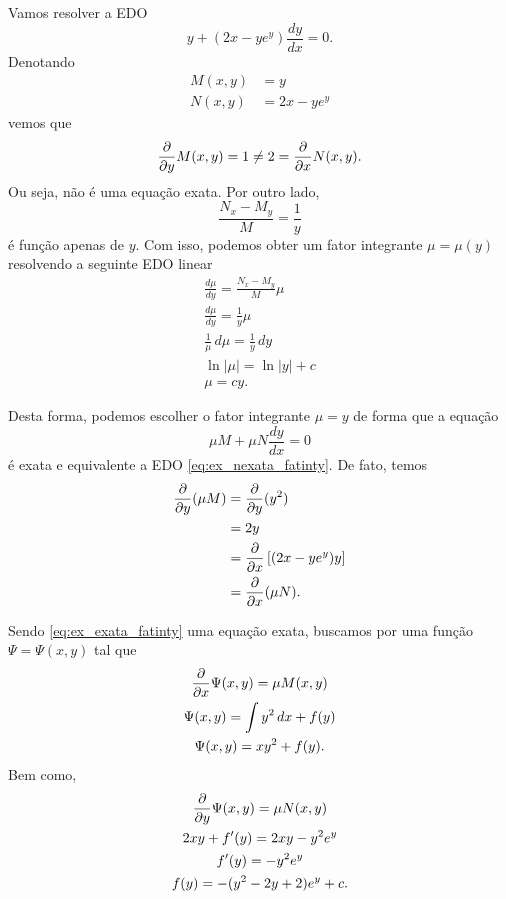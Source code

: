 \begin{ex}
  Vamos resolver a EDO
  \begin{equation}\label{eq:ex_nexata_fatinty}
    y + (2x - ye^y)\frac{dy}{dx} = 0.
  \end{equation}
  Denotando
  \begin{align}
    M(x,y) &= y \\
    N(x,y) &= 2x - ye^y
  \end{align}
  vemos que
  \begin{equation}
    \frac{\partial}{\partial y}M(x,y) = 1 \neq 2 = \frac{\partial}{\partial x}N(x,y).
  \end{equation}
  Ou seja, não é uma equação exata. Por outro lado,
  \begin{equation}
    \frac{N_x-M_y}{M} = \frac{1}{y}
  \end{equation}
  é função apenas de $y$. Com isso, podemos obter um fator integrante $\mu = \mu(y)$ resolvendo a seguinte EDO linear
  \begin{gather}
    \frac{d\mu}{dy} = \frac{N_x-M_y}{M}\mu \\
    \frac{d\mu}{dy} = \frac{1}{y}\mu \\
    \frac{1}{\mu}\,d\mu = \frac{1}{y}\,dy \\
    \ln|\mu| = \ln|y| + c \\
    \mu = cy.
  \end{gather}

  Desta forma, podemos escolher o fator integrante $\mu = y$ de forma que a equação
  \begin{equation}\label{eq:ex_exata_fatinty}
    \mu M + \mu N\frac{dy}{dx} = 0
  \end{equation}
  é exata e equivalente a EDO \eqref{eq:ex_nexata_fatinty}. De fato, temos
  \begin{align}
    \frac{\partial}{\partial y}(\mu M) &= \frac{\partial}{\partial y}(y^2) \\
    &= 2y \\
    &= \frac{\partial}{\partial x}\left[(2x-ye^y)y\right] \\
    &= \frac{\partial}{\partial x}(\mu N).
  \end{align}
  
  Sendo \eqref{eq:ex_exata_fatinty} uma equação exata, buscamos por uma função $\Psi = \Psi(x,y)$ tal que
  \begin{gather}
    \frac{\partial}{\partial x}\Psi(x,y) = \mu M(x,y) \\
    \Psi(x,y) = \int y^2\,dx + f(y) \\
    \Psi(x,y) = xy^2 + f(y).
  \end{gather}
  Bem como,
  \begin{gather}
    \frac{\partial}{\partial y}\Psi(x,y) = \mu N(x,y) \\
    2xy + f'(y) = 2xy - y^2e^{y} \\
    f'(y) = -y^2e^{y} \\
    f(y) = -(y^2-2y+2)e^y + c.
  \end{gather}


\end{ex}

